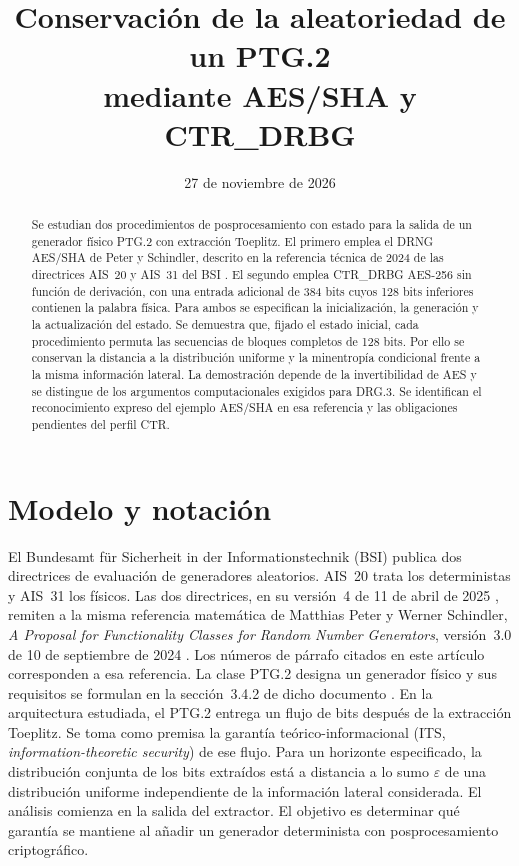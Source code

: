 \documentclass[11pt,a4paper]{article}
\title{Conservación de la aleatoriedad de un PTG.2\\ mediante AES/SHA y CTR\_DRBG}
\author{}
\date{27 de noviembre de 2026}
\begin{document}
\maketitle
\begin{abstract}
Se estudian dos procedimientos de posprocesamiento con estado para la salida de un generador físico PTG.2 con extracción Toeplitz. El primero emplea el DRNG AES/SHA de Peter y Schindler, descrito en la referencia técnica de 2024 de las directrices AIS~20 y AIS~31 del BSI \cite[párrs.~996--998]{ais}. El segundo emplea CTR\_DRBG AES-256 sin función de derivación, con una entrada adicional de 384 bits cuyos 128 bits inferiores contienen la palabra física. Para ambos se especifican la inicialización, la generación y la actualización del estado. Se demuestra que, fijado el estado inicial, cada procedimiento permuta las secuencias de bloques completos de 128 bits. Por ello se conservan la distancia a la distribución uniforme y la minentropía condicional frente a la misma información lateral. La demostración depende de la invertibilidad de AES y se distingue de los argumentos computacionales exigidos para DRG.3. Se identifican el reconocimiento expreso del ejemplo AES/SHA en esa referencia y las obligaciones pendientes del perfil CTR.
\end{abstract}

\section{Modelo y notación}
El Bundesamt für Sicherheit in der Informationstechnik (BSI) publica dos directrices de evaluación de generadores aleatorios. AIS~20 trata los deterministas y AIS~31 los físicos. Las dos directrices, en su versión~4 de 11 de abril de 2025 \cite[ap.~2, punto~2, p.~5 y ref.~3, p.~8]{ais20,ais31}, remiten a la misma referencia matemática de Matthias Peter y Werner Schindler, \emph{A Proposal for Functionality Classes for Random Number Generators}, versión~3.0 de 10 de septiembre de 2024 \cite{ais}. Los números de párrafo citados en este artículo corresponden a esa referencia. La clase PTG.2 designa un generador físico y sus requisitos se formulan en la sección~3.4.2 de dicho documento \cite[párrs.~321 y 327]{ais}. En la arquitectura estudiada, el PTG.2 entrega un flujo de bits después de la extracción Toeplitz. Se toma como premisa la garantía teórico-informacional (ITS, \emph{information-theoretic security}) de ese flujo. Para un horizonte especificado, la distribución conjunta de los bits extraídos está a distancia a lo sumo \(\varepsilon\) de una distribución uniforme independiente de la información lateral considerada. El análisis comienza en la salida del extractor. El objetivo es determinar qué garantía se mantiene al añadir un generador determinista con posprocesamiento criptográfico.
\end{document}
